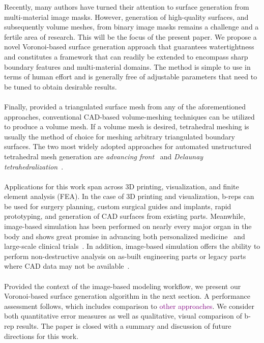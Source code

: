 Recently, many authors have turned their attention to surface generation from multi-material image masks. However, generation of high-quality surfaces, and subsequently volume meshes, from binary image masks remains a challenge and a fertile area of research. This will be the focus of the present paper.  We propose a novel Voronoi-based surface generation approach that guarantees watertightness and constitutes a framework that can readily be extended to encompass sharp boundary features and multi-material domains. The method is simple to use in terms of human effort and is generally free of adjustable parameters that need to be tuned to obtain desirable results. \\ \\
%
Finally, provided a triangulated surface mesh from any of the aforementioned approaches, conventional CAD-based volume-meshing techniques can be utilized to produce a volume mesh. If a volume mesh is desired, tetrahedral meshing is usually the method of choice for meshing arbitrary triangulated boundary surfaces. The two most widely adopted approaches for automated unstructured tetrahedral mesh generation are \textit{advancing front}~\cite{jin_1993, lohner_1988} and \textit{Delaunay tetrahedralization}~\cite{lohner_1997}. \\ \\
%
Applications for this work span across 3D printing, visualization, and finite element analysis (FEA). In the case of 3D printing and visualization, b-reps can be used for surgery planning, custom surgical guides and implants, rapid prototyping, and generation of CAD surfaces from existing parts. Meanwhile, image-based simulation has been performed on nearly every major organ in the body and shows great promise in advancing both personalized medicine~\cite{neal2010current} and large-scale clinical trials~\cite{viceconti2016silico}. In addition, image-based simulation offers the ability to perform non-destructive analysis on as-built engineering parts or legacy parts where CAD data may not be available~\cite{bradley2005advances}.\\ \\
%
Provided the context of the image-based modeling workflow, we present our Voronoi-based surface generation algorithm in the next section. A performance assessment follows, which includes comparison to \textcolor{purple}{other approaches}.  We consider both quantitative error measures as well as qualitative, visual comparison of b-rep results.  The paper is closed with a summary and discussion of future directions for this work.